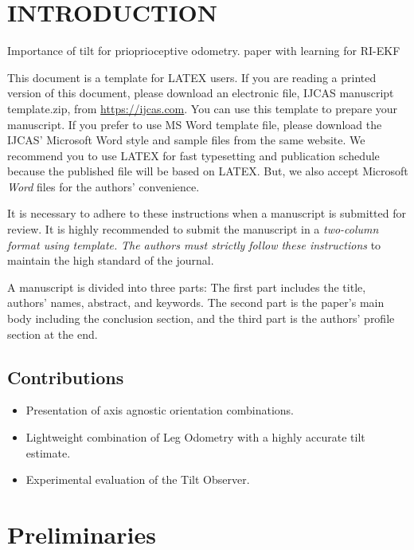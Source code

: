\documentclass{IJCAS}
\begin{document}




\section{INTRODUCTION}

Importance of tilt for prioprioceptive odometry. paper with learning for RI-EKF


This document is a template for LATEX users. If you are reading a printed version of this document, please download an electronic file, IJCAS manuscript template.zip, from \url{https://ijcas.com}. You can use this template to prepare your manuscript. If you prefer to use MS Word template file, please download the IJCAS' Microsoft Word style and sample files from the same website. We recommend you to use LATEX for fast typesetting and publication schedule because the published file will be based on LATEX. But, we also accept Microsoft \textit{Word} files for the authors' convenience.

It is necessary to adhere to these instructions when a manuscript is submitted for review. It is highly recommended to submit the manuscript in a \textit{two-column format using template.} \textit{The authors must strictly follow these instructions} to maintain the high standard of the journal. 

A manuscript is divided into three parts: The first part includes the title, authors' names, abstract, and keywords. The second part is the paper's main body including the conclusion section, and the third part is the authors' profile section at the end.

\subsection{Contributions}
\begin{itemize}
  \item Presentation of axis agnostic orientation combinations.
  \item Lightweight combination of Leg Odometry with a highly accurate tilt estimate.
  \item Experimental evaluation of the Tilt Observer.
\end{itemize}

\section{Preliminaries}
\end{document}
